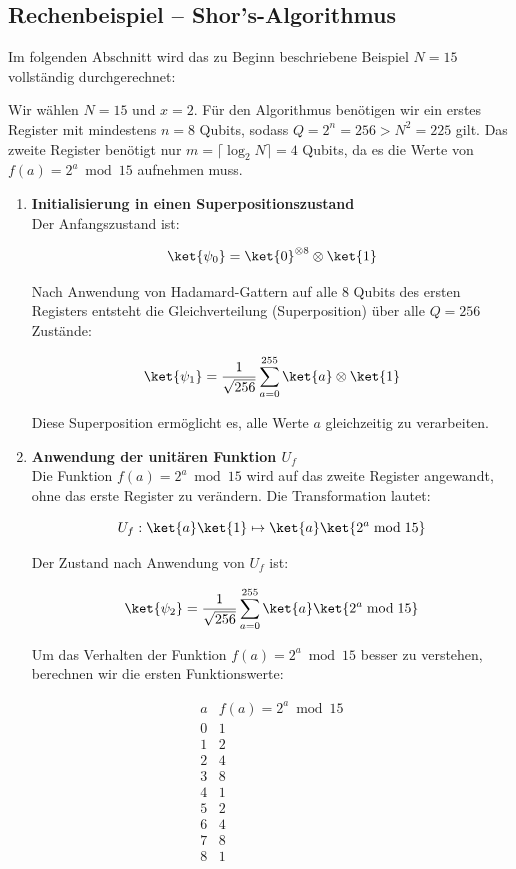 {\subsection{Rechenbeispiel – Shor's-Algorithmus}

Im folgenden Abschnitt wird das zu Beginn beschriebene Beispiel \( N = 15 \) vollständig durchgerechnet:

Wir wählen \( N = 15 \) und \( x = 2 \). Für den Algorithmus benötigen wir ein erstes Register mit mindestens \( n = 8 \) Qubits, sodass \( Q = 2^n = 256 > N^2 = 225 \) gilt. Das zweite Register benötigt nur \( m = \lceil \log_2 N \rceil = 4 \) Qubits, da es die Werte von \( f(a) = 2^a \bmod 15 \) aufnehmen muss.

\begin{enumerate}
    \item \textbf{Initialisierung in einen Superpositionszustand} \\
    Der Anfangszustand ist:

    \[
    \ket{\psi_0} = \ket{0}^{\otimes 8} \otimes \ket{1}
    \]

    Nach Anwendung von Hadamard-Gattern auf alle 8 Qubits des ersten Registers entsteht die Gleichverteilung (Superposition) über alle \( Q = 256 \) Zustände:

    \[
    \ket{\psi_1} = \frac{1}{\sqrt{256}} \sum_{a=0}^{255} \ket{a} \otimes \ket{1}
    \]

    Diese Superposition ermöglicht es, alle Werte \( a \) gleichzeitig zu verarbeiten.\\

    \item \textbf{Anwendung der unitären Funktion \( U_f \)} \\

    Die Funktion \( f(a) = 2^a \bmod 15 \) wird auf das zweite Register angewandt, ohne das erste Register zu verändern. Die Transformation lautet:

    \[
    U_f: \ket{a} \ket{1} \mapsto \ket{a} \ket{2^a \bmod 15}
    \]

    Der Zustand nach Anwendung von \( U_f \) ist:

    \[
    \ket{\psi_2} = \frac{1}{\sqrt{256}} \sum_{a=0}^{255} \ket{a} \ket{2^a \bmod 15}
    \]

    Um das Verhalten der Funktion \( f(a) = 2^a \bmod 15 \) besser zu verstehen, berechnen wir die ersten Funktionswerte:

    \[
    \begin{array}{c|c}
    a & f(a) = 2^a \bmod 15 \\
    \hline
    0 & 1 \\
    1 & 2 \\
    2 & 4 \\
    3 & 8 \\
    4 & 1 \\
    5 & 2 \\
    6 & 4 \\
    7 & 8 \\
    8 & 1 \\
    \end{array}
    \]


\end{enumerate}}
